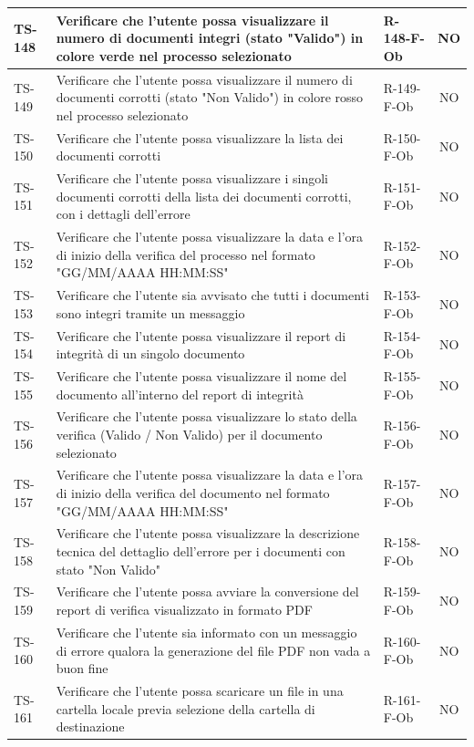 \documentclass[a4paper,12pt]{article}
\begin{document}
\begin{longtable}{|p{1.5cm}|p{8.3cm}|p{2.4cm}|c|}
\hline
TS-148 & Verificare che l'utente possa visualizzare il numero di documenti integri (stato "Valido") in colore verde nel processo selezionato & R-148-F-Ob & NO \\
\hline
TS-149 & Verificare che l'utente possa visualizzare il numero di documenti corrotti (stato "Non Valido") in colore rosso nel processo selezionato & R-149-F-Ob & NO \\
\hline
TS-150 & Verificare che l'utente possa visualizzare la lista dei documenti corrotti & R-150-F-Ob & NO \\
\hline
TS-151 & Verificare che l'utente possa visualizzare i singoli documenti corrotti della lista dei documenti corrotti, con i dettagli dell'errore & R-151-F-Ob & NO \\
\hline
TS-152 & Verificare che l'utente possa visualizzare la data e l'ora di inizio della verifica del processo nel formato "GG/MM/AAAA HH:MM:SS" & R-152-F-Ob & NO \\
\hline
TS-153 & Verificare che l'utente sia avvisato che tutti i documenti sono integri tramite un messaggio & R-153-F-Ob & NO \\
\hline
TS-154 & Verificare che l'utente possa visualizzare il report di integrità di un singolo documento & R-154-F-Ob & NO \\
\hline
TS-155 & Verificare che l'utente possa visualizzare il nome del documento all'interno del report di integrità & R-155-F-Ob & NO \\
\hline
TS-156 & Verificare che l'utente possa visualizzare lo stato della verifica (Valido / Non Valido) per il documento selezionato & R-156-F-Ob & NO \\
\hline
TS-157 & Verificare che l'utente possa visualizzare la data e l'ora di inizio della verifica del documento nel formato "GG/MM/AAAA HH:MM:SS" & R-157-F-Ob & NO \\
\hline
TS-158 & Verificare che l'utente possa visualizzare la descrizione tecnica del dettaglio dell'errore per i documenti con stato "Non Valido" & R-158-F-Ob & NO \\
\hline
TS-159 & Verificare che l'utente possa avviare la conversione del report di verifica visualizzato in formato PDF & R-159-F-Ob & NO \\
\hline
TS-160 & Verificare che l'utente sia informato con un messaggio di errore qualora la generazione del file PDF non vada a buon fine & R-160-F-Ob & NO \\
\hline
TS-161 & Verificare che l'utente possa scaricare un file in una cartella locale previa selezione della cartella di destinazione & R-161-F-Ob & NO \\

\end{longtable}
\end{document}
